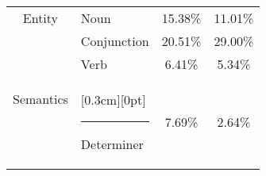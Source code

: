 \begin{table*}[htbp]
\begin{minipage}{\textwidth}
\begin{tabular}{cl|cc}
        
         \multirow{1}{*}{Entity}&  \hspace{2.7em} Noun & 15.38\% & 11.01\% \\

        
         \multirow{3}{*}{Semantics}& \vline \hspace{1.4em} Conjunction & 20.51\% & 29.00\% \\
         & \vline \hspace{2.8em} Verb & 6.41\% & 5.34\% \\
         & \raisebox{0pt}[0.3cm][0pt]{\rule{0.5pt}{1cm}} \hspace{1.5em} Determiner & 7.69\% & 2.64\% \\
         
         \bottomrule
   \end{tabular}
   

  \label{tab:Math_Mistral_confused_proportion}
    \end{minipage}
\end{table*}


\clearpage


